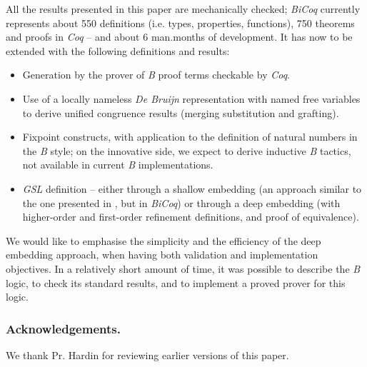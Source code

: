 \documentclass{llncs}
\begin{document}
All the results presented in this paper are mechanically checked; \emph{BiCoq} currently 
represents about 550 definitions (i.e. types, properties, functions), 750 theorems and proofs 
in \emph{Coq} -- and about 6 man.months of development. It has now to be extended with the 
following definitions and results:
\begin{itemize}
\item Generation by the prover of \emph{B} proof terms checkable by \emph{Coq}.
\item Use of a locally nameless \emph{De Bruijn} representation with named free variables to 
derive unified congruence results (merging substitution and grafting).
\item Fixpoint constructs, with application to the definition of natural numbers in the 
\emph{B} style; on the innovative side, we expect to derive inductive \emph{B} tactics, not 
available in current \emph{B} implementations.
\item \emph{GSL} definition -- either through a shallow embedding (an approach similar to the
one presented in \cite{bod:1b}, but in \emph{BiCoq}) or through a deep embedding (with 
higher-order and first-order refinement definitions, and proof of equivalence).
\end{itemize}

We would like to emphasise the simplicity and the efficiency of the deep embedding approach, 
when having both validation and implementation objectives. In a relatively short amount of 
time, it was possible to describe the \emph{B} logic, to check its standard results, and to 
implement a proved prover for this logic.

\subsubsection*{\small Acknowledgements.}\label{sc_ack}\small We thank Pr. Hardin for 
reviewing earlier versions of this paper.







\end{document}
